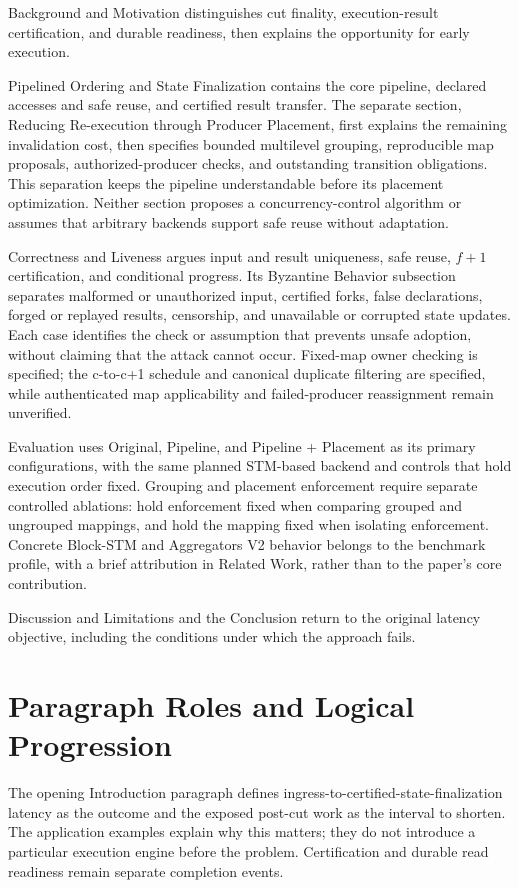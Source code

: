 \documentclass[11pt]{article}
\begin{document}
Background and Motivation distinguishes cut finality, execution-result certification, and durable readiness, then explains the opportunity for early execution.

Pipelined Ordering and State Finalization contains the core pipeline, declared accesses and safe reuse, and certified result transfer. The separate section, Reducing Re-execution through Producer Placement, first explains the remaining invalidation cost, then specifies bounded multilevel grouping, reproducible map proposals, authorized-producer checks, and outstanding transition obligations. This separation keeps the pipeline understandable before its placement optimization. Neither section proposes a concurrency-control algorithm or assumes that arbitrary backends support safe reuse without adaptation.

Correctness and Liveness argues input and result uniqueness, safe reuse, \(f+1\) certification, and conditional progress. Its Byzantine Behavior subsection separates malformed or unauthorized input, certified forks, false declarations, forged or replayed results, censorship, and unavailable or corrupted state updates. Each case identifies the check or assumption that prevents unsafe adoption, without claiming that the attack cannot occur. Fixed-map owner checking is specified; the c-to-c+1 schedule and canonical duplicate filtering are specified, while authenticated map applicability and failed-producer reassignment remain unverified.

Evaluation uses Original, Pipeline, and Pipeline + Placement as its primary configurations, with the same planned STM-based backend and controls that hold execution order fixed. Grouping and placement enforcement require separate controlled ablations: hold enforcement fixed when comparing grouped and ungrouped mappings, and hold the mapping fixed when isolating enforcement. Concrete Block-STM and Aggregators V2 behavior belongs to the benchmark profile, with a brief attribution in Related Work, rather than to the paper's core contribution.

Discussion and Limitations and the Conclusion return to the original latency objective, including the conditions under which the approach fails.

\section{Paragraph Roles and Logical Progression}

The opening Introduction paragraph defines ingress-to-certified-state-finalization latency as the outcome and the exposed post-cut work as the interval to shorten. The application examples explain why this matters; they do not introduce a particular execution engine before the problem. Certification and durable read readiness remain separate completion events.
\end{document}
